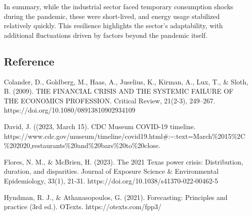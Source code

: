 \documentclass[
  letterpaper,
  DIV=11,
  numbers=noendperiod]{scrartcl}
\begin{document}
In summary, while the industrial sector faced temporary consumption
shocks during the pandemic, these were short-lived, and energy usage
stabilized relatively quickly. This resilience highlights the sector's
adaptability, with additional fluctuations driven by factors beyond the
pandemic itself.

\subsection{Reference}\label{reference}

Colander, D., Goldberg, M., Haas, A., Juselius, K., Kirman, A., Lux, T.,
\& Sloth, B. (2009). THE FINANCIAL CRISIS AND THE SYSTEMIC FAILURE OF
THE ECONOMICS PROFESSION. Critical Review, 21(2-3), 249--267.
https://doi.org/10.1080/08913810902934109

David, J. ((2023, March 15). CDC Museum COVID-19 timeline.
https://www.cdc.gov/museum/timeline/covid19.html\#:\textasciitilde:text=March\%2015\%2C\%202020,restaurants\%20and\%20bars\%20to\%20close.

Flores, N. M., \& McBrien, H. (2023). The 2021 Texas power crisis:
Distribution, duration, and disparities. Journal of Exposure Science \&
Environmental Epidemiology, 33(1), 21-31.
https://doi.org/10.1038/s41370-022-00462-5

Hyndman, R. J., \& Athanasopoulos, G. (2021). Forecasting: Principles
and practice (3rd ed.). OTexts. https://otexts.com/fpp3/
\end{document}
